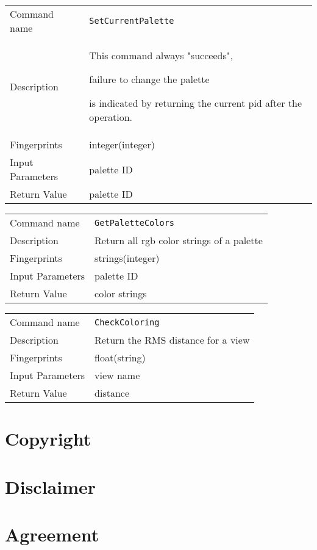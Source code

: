 \noindent
\begin{tabular}{l|p{5in}}
\hline
Command name &{\tt SetCurrentPalette }\\ 
Description &
This command always "succeeds", 
 
failure to change the palette
 
is indicated by returning the current pid after the operation.
 	\\
Fingerprints & integer(integer)\\
Input Parameters&palette ID\\
Return Value&palette ID\\
\hline
\end{tabular}
\bigskip

\noindent
\begin{tabular}{l|p{5in}}
\hline
Command name &{\tt GetPaletteColors }\\ 
Description &
Return all rgb color strings of a palette
 	\\
Fingerprints & strings(integer)\\
Input Parameters&palette ID\\
Return Value&color strings\\
\hline
\end{tabular}
\bigskip

\noindent
\begin{tabular}{l|p{5in}}
\hline
Command name &{\tt CheckColoring }\\ 
Description &
Return the RMS distance for a view
 	\\
Fingerprints & float(string)\\
Input Parameters&view name\\
Return Value&distance\\
\hline
\end{tabular}
\bigskip



\newpage
\section*{Copyright}



\section*{Disclaimer}



\newpage
\section*{Agreement}




